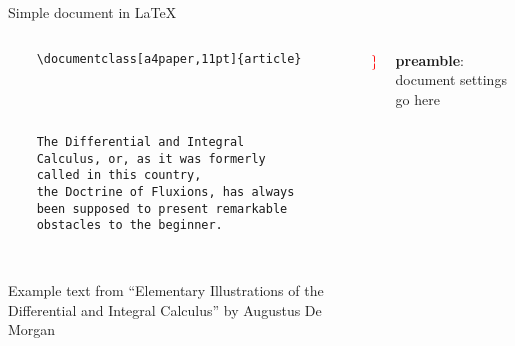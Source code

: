 

\begin{frame}[fragile, t]{Simple document in \LaTeX}
	\begin{columns}
        \begin{column}{0.5\textwidth}
	\begin{verbatim} 
	\documentclass[a4paper,11pt]{article}

		
	

	The Differential and Integral 
	Calculus, or, as it was formerly 
	called in this country, 
	the Doctrine of Fluxions, has always 
	been supposed to present remarkable 
	obstacles to the beginner.

	
	\end{verbatim}

	Example text from ``Elementary Illustrations of the Differential and Integral Calculus'' by Augustus De Morgan
\end{column}
\begin{column}{0.05\textwidth}
	{\Huge \textcolor{red}{ \} } }
	\\[2cm]
	\phantom{{\Huge \textcolor{red}{ \} } }}
	
\end{column}
\begin{column}{0.3\textwidth}
	\textbf{preamble}: document settings go here
	\\[2cm]
\end{column}
\end{columns}

\end{frame}
